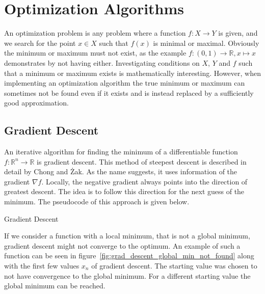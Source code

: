 \chapter{Optimization Algorithms}
\label{chapter:optimization}

An optimization problem is any problem where a function $f\colon X \rightarrow Y$ is given, and we search for the point $x \in X$ such that $f(x)$ is minimal or maximal. Obviously the minimum or maximum must not exist, as the example $f\colon (0, 1) \rightarrow \mathds{R}, x \mapsto x$ demonstrates by not having either. Investigating conditions on $X$, $Y$ and $f$ such that a minimum or maximum exists is mathematically interesting. However, when implementing an optimization algorithm the true minimum or maximum can sometimes not be found even if it exists and is instead replaced by a sufficiently good approximation.

\section{Gradient Descent}

An iterative algorithm for finding the minimum of a differentiable function $f\colon \mathds{R}^n \rightarrow \mathds{R}$ is gradient descent. This method of steepest descent is described in detail by Chong and Żak\cite{Chong2013}. As the name suggests, it uses information of the gradient $\nabla f$. Locally, the negative gradient always points into the direction of greatest descent. The idea is to follow this direction for the next guess of the minimum. The pseudocode of this approach is given below.

\begin{algorithm}[H] \label{alg:gradient_descent}
	\SetAlgoLined
	\DontPrintSemicolon
	\LinesNumbered
	\caption{Gradient Descent}
	
	\BlankLine
\end{algorithm}

If we consider a function with a local minimum, that is not a global minimum, gradient descent might not converge to the optimum. An example of such a function can be seen in figure~\ref{fig:grad_descent_global_min_not_found} along with the first few values $x_n$ of gradient descent. The starting value was chosen to not have convergence to the global minimum. For a different starting value the global minimum can be reached.

